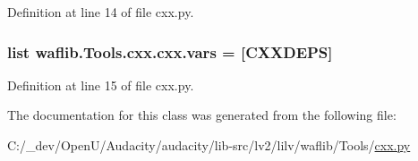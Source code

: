 Definition at line 14 of file cxx.\+py.

\subsubsection[{\texorpdfstring{vars}{vars}}]{\setlength{\rightskip}{0pt plus 5cm}list waflib.\+Tools.\+cxx.\+cxx.\+vars = \mbox{[}\textquotesingle{}C\+X\+X\+D\+E\+PS\textquotesingle{}\mbox{]}\hspace{0.3cm}{\ttfamily [static]}}\hypertarget{classwaflib_1_1_tools_1_1cxx_1_1cxx_a99795cdc815a15885c0f0acd0977901f}{}\label{classwaflib_1_1_tools_1_1cxx_1_1cxx_a99795cdc815a15885c0f0acd0977901f}


Definition at line 15 of file cxx.\+py.



The documentation for this class was generated from the following file\+:\begin{DoxyCompactItemize}
\item 
C\+:/\+\_\+dev/\+Open\+U/\+Audacity/audacity/lib-\/src/lv2/lilv/waflib/\+Tools/\hyperlink{lilv_2waflib_2_tools_2cxx_8py}{cxx.\+py}\end{DoxyCompactItemize}
